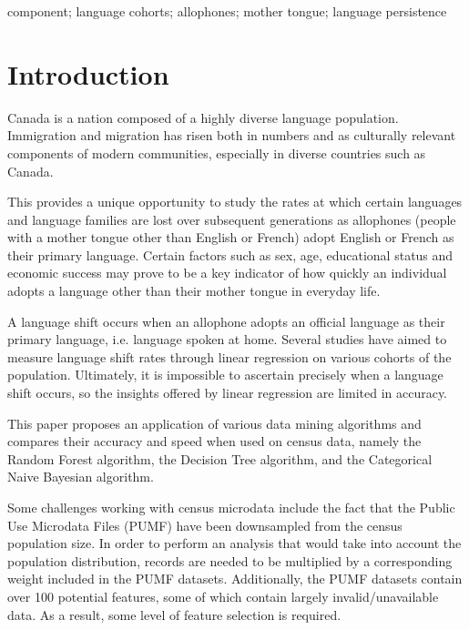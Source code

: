 \documentclass[10pt, conference, compsocconf]{IEEEtran}
\begin{document}
\begin{IEEEkeywords}
component; language cohorts; allophones; mother tongue; language persistence

\end{IEEEkeywords}


%
\IEEEpeerreviewmaketitle



\section{Introduction}
Canada is a nation composed of a highly diverse language population. Immigration and migration has risen both in numbers and as culturally relevant components of modern communities, especially in diverse countries such as Canada.

This provides a unique opportunity to study the rates at which certain languages and language families are lost over subsequent generations as allophones (people with a mother tongue other than English or French) adopt English or French as their primary language. Certain factors such as sex, age, educational status and economic success may prove to be a key indicator of how quickly an individual adopts a language other than their mother tongue in everyday life.

A language shift occurs when an allophone adopts an official language as their primary language, i.e. language spoken at home. Several studies have aimed to measure language shift rates through linear regression on various cohorts of the population. Ultimately, it is impossible to ascertain precisely when a language shift occurs, so the insights offered by linear regression are limited in accuracy.

This paper proposes an application of various data mining algorithms and compares their accuracy and speed when used on census data, namely the Random Forest algorithm, the Decision Tree algorithm, and the Categorical Naive Bayesian algorithm.

Some challenges working with census microdata include the fact that the Public Use Microdata Files (PUMF) have been downsampled from the census population size. In order to perform an analysis that would take into account the population distribution, records are needed to be multiplied by a corresponding weight included in the PUMF datasets. Additionally, the PUMF datasets contain over 100 potential features, some of which contain largely invalid/unavailable data. As a result, some level of feature selection is required.
\end{document}
